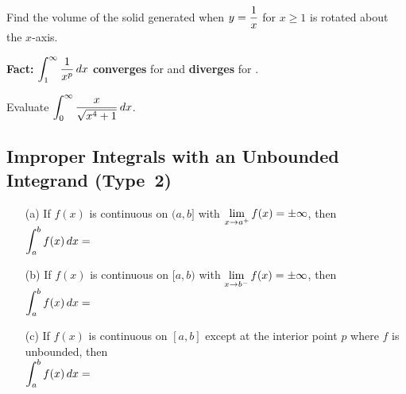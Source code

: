 \documentclass[12pt]{article}
\begin{document}
\newpage

\Example Find the volume of the solid generated when $y=\displaystyle\frac{1}{x}$ for $x\geq 1$ is rotated about the $x$-axis.

\begin{flushright}
\end{flushright}

\vfill

\textbf{Fact:} $\displaystyle\int_1^\infty\frac{1}{x^p}\,dx$ \textbf{converges} for \underline{\hspace{30mm}} and \textbf{diverges} for \underline{\hspace{30mm}}.

\newpage

\Example Evaluate $\displaystyle\int_0^\infty \frac{x}{\sqrt{x^4+1}}\,dx$.

\newpage

\subsection*{Improper Integrals with an Unbounded Integrand (Type~2)}

\begin{itemize}

\item[(a)] If $f(x)$ is continuous on $(a,b]$ with $\displaystyle\lim_{x\to a^+}f(x)=\pm\infty$, then\\

$\displaystyle\int_a^bf(x)\,dx=$

\vspace{40mm}

\item[(b)] If $f(x)$ is continuous on $[a,b)$ with $\displaystyle\lim_{x\to b^-}f(x)=\pm\infty$, then\\

$\displaystyle\int_a^b f(x)\,dx=$

\vspace{40mm}

\item[(c)] If $f(x)$ is continuous on $[a,b]$ except at the interior point $p$ where $f$ is unbounded, then\\

$\displaystyle\int_a^b f(x)\,dx=$

\vspace{40mm}
\end{itemize}
\end{document}
